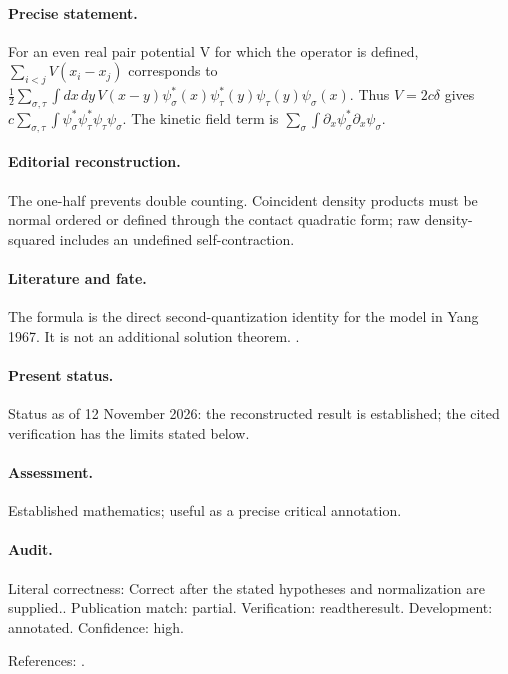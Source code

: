 \paragraph{Precise statement.} For an even real pair potential V for which the operator is defined, $\sum_{i<j}V(x_i-x_j)$ corresponds to $\frac12\sum_{\sigma,\tau}\int dx\,dy\,V(x-y)\psi_\sigma^*(x)\psi_\tau^*(y)\psi_\tau(y)\psi_\sigma(x)$. Thus $V=2c\delta$ gives $c\sum_{\sigma,\tau}\int\psi_\sigma^*\psi_\tau^*\psi_\tau\psi_\sigma$. The kinetic field term is $\sum_\sigma\int\partial_x\psi_\sigma^*\partial_x\psi_\sigma$.

\paragraph{Editorial reconstruction.} The one-half prevents double counting. Coincident density products must be normal ordered or defined through the contact quadratic form; raw density-squared includes an undefined self-contraction.

\paragraph{Literature and fate.} The formula is the direct second-quantization identity for the model in Yang 1967. It is not an additional solution theorem. \citep{yang1967manybody}.

\paragraph{Present status.} Status as of 12 November 2026: the reconstructed result is established; the cited verification has the limits stated below.

\paragraph{Assessment.} Established mathematics; useful as a precise critical annotation.

\paragraph{Audit.} Literal correctness: Correct after the stated hypotheses and normalization are supplied.. Publication match: partial. Verification: readtheresult. Development: annotated. Confidence: high.

\noindent References: \citep{yang1967manybody}.\par

